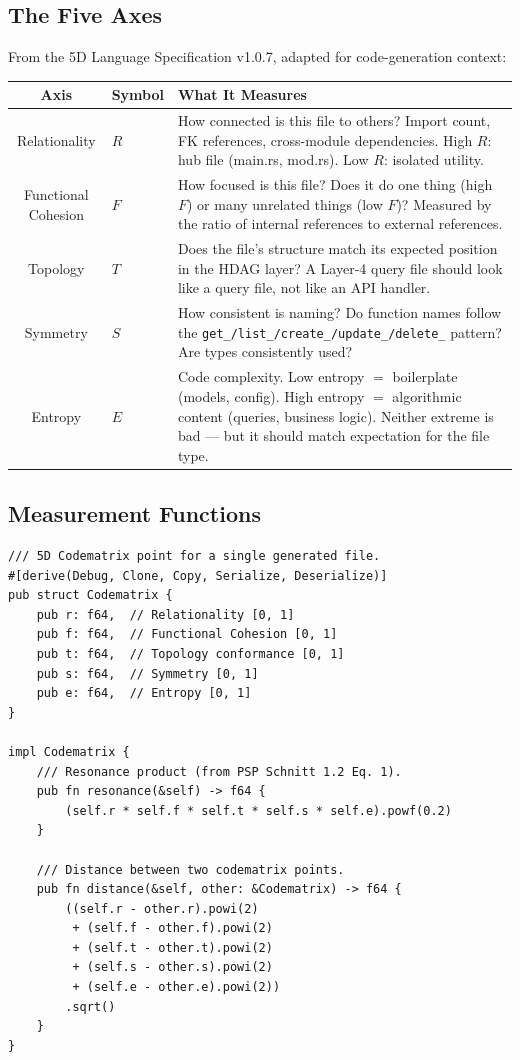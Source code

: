 \documentclass[11pt,a4paper]{article}
\begin{document}
\subsection{The Five Axes}

From the 5D Language Specification v1.0.7, adapted for 
code-generation context:

\begin{longtable}{clp{7cm}}
\toprule
\textbf{Axis} & \textbf{Symbol} & \textbf{What It Measures} \\
\midrule
Relationality & $R$ 
  & How connected is this file to others? Import count, 
    FK references, cross-module dependencies. High $R$: 
    hub file (main.rs, mod.rs). Low $R$: isolated utility. \\
Functional Cohesion & $F$ 
  & How focused is this file? Does it do one thing (high $F$) 
    or many unrelated things (low $F$)? Measured by the ratio 
    of internal references to external references. \\
Topology & $T$ 
  & Does the file's structure match its expected position in 
    the HDAG layer? A Layer-4 query file should look like a 
    query file, not like an API handler. \\
Symmetry & $S$ 
  & How consistent is naming? Do function names follow the 
    \texttt{get\_/list\_/create\_/update\_/delete\_} pattern? 
    Are types consistently used? \\
Entropy & $E$ 
  & Code complexity. Low entropy $=$ boilerplate 
    (models, config). High entropy $=$ algorithmic content 
    (queries, business logic). Neither extreme is bad --- but 
    it should match expectation for the file type. \\
\bottomrule
\end{longtable}

\subsection{Measurement Functions}

\begin{lstlisting}[style=rust]
/// 5D Codematrix point for a single generated file.
#[derive(Debug, Clone, Copy, Serialize, Deserialize)]
pub struct Codematrix {
    pub r: f64,  // Relationality [0, 1]
    pub f: f64,  // Functional Cohesion [0, 1]
    pub t: f64,  // Topology conformance [0, 1]
    pub s: f64,  // Symmetry [0, 1]
    pub e: f64,  // Entropy [0, 1]
}

impl Codematrix {
    /// Resonance product (from PSP Schnitt 1.2 Eq. 1).
    pub fn resonance(&self) -> f64 {
        (self.r * self.f * self.t * self.s * self.e).powf(0.2)
    }
    
    /// Distance between two codematrix points.
    pub fn distance(&self, other: &Codematrix) -> f64 {
        ((self.r - other.r).powi(2)
         + (self.f - other.f).powi(2)
         + (self.t - other.t).powi(2)
         + (self.s - other.s).powi(2)
         + (self.e - other.e).powi(2))
        .sqrt()
    }
}
\end{lstlisting}
\end{document}
